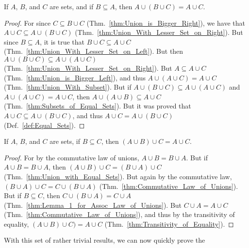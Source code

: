         \begin{theorem}
            \label{thm:Lemma_1_for_Assoc_Law_of_Unions}%
            If $A$, $B$, and $C$ are sets, and if $B\subseteq{A}$, then
            $A\cup(B\cup{C})=A\cup{C}$.
        \end{theorem}
        \begin{proof}
            For since $C\subseteq{B}\cup{C}$
            (Thm.~\ref{thm:Union_is_Bigger_Right}), we have that
            $A\cup{C}\subseteq{A}\cup(B\cup{C})$
            (Thm.~\ref{thm:Union_With_Lesser_Set_on_Right}). But since
            $B\subseteq{A}$, it is true that $B\cup{C}\subseteq{A}\cup{C}$
            (Thm.~\ref{thm:Union_With_Lesser_Set_on_Left}). But then
            $A\cup(B\cup{C})\subseteq{A}\cup(A\cup{C})$
            (Thm.~\ref{thm:Union_With_Lesser_Set_on_Right}). But
            $A\subseteq{A}\cup{C}$ (Thm.~\ref{thm:Union_is_Bigger_Left}), and
            thus $A\cup(A\cup{C})=A\cup{C}$ (Thm.~\ref{thm:Union_With_Subset}).
            But if $A\cup(B\cup{C})\subseteq{A}\cup(A\cup{C})$ and
            $A\cup(A\cup{C})=A\cup{C}$, then
            $A\cup(A\cup{B})\subseteq{A}\cup{C}$
            (Thm.~\ref{thm:Subsets_of_Equal_Sets}). But it was proved that
            $A\cup{C}\subseteq{A}\cup(B\cup{C})$, and thus
            $A\cup{C}=A\cup(B\cup{C})$ (Def.~\ref{def:Equal_Sets}).
        \end{proof}
        \begin{theorem}
            \label{thm:Lemma_2_for_Assoc_Law_of_Unions}%
            If $A$, $B$, and $C$ are sets, if $B\subseteq{C}$, then
            $(A\cup{B})\cup{C}=A\cup{C}$.
        \end{theorem}
        \begin{proof}
            For by the commutative law of unions,
            $A\cup{B}=B\cup{A}$. But if $A\cup{B}=B\cup{A}$, then
            $(A\cup{B})\cup{C}=(B\cup{A})\cup{C}$
            (Thm.~\ref{thm:Union_with_Equal_Sets}). But again by the commutative
            law, $(B\cup{A})\cup{C}=C\cup(B\cup{A})$
            (Thm.~\ref{thm:Commutative_Law_of_Unions}). But if
            $B\subseteq{C}$, then $C\cup(B\cup{A})=C\cup{A}$
            (Thm.~\ref{thm:Lemma_1_for_Assoc_Law_of_Unions}). But
            $C\cup{A}=A\cup{C}$ (Thm.~\ref{thm:Commutative_Law_of_Unions}),
            and thus by the transitivity of equality,
            $(A\cup{B})\cup{C})=A\cup{C}$
            (Thm.~\ref{thm:Transitivity_of_Equality}).
        \end{proof}
        With this set of rather trivial results, we can now quickly prove the
